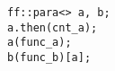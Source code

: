 
  \begin{lstlisting}[mathescape]
ff::para<> a, b;
a.then(cnt_a);
a(func_a);
b(func_b)[a];
  \end{lstlisting}
